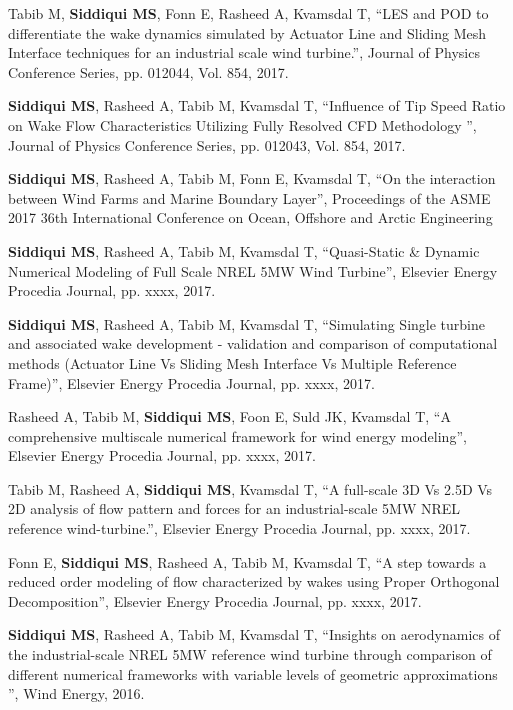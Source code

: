 \begin{cventries}
	\cventry
	{} %
	{} %
	{} %
	{} %
	{
		\begin{cvitems}
			\item {Tabib M, \textbf{Siddiqui MS}, Fonn E, Rasheed A, Kvamsdal T, “LES and POD to differentiate the wake dynamics simulated by Actuator Line and Sliding
				Mesh Interface techniques for an industrial scale
				wind turbine.”, Journal of Physics Conference Series, pp. 012044, Vol. 854, 2017.}
			\item {\textbf{Siddiqui MS}, Rasheed A, Tabib M, Kvamsdal T, “Influence of Tip Speed Ratio on Wake Flow Characteristics Utilizing Fully Resolved CFD Methodology ”, Journal of Physics Conference Series, pp. 012043, Vol. 854, 2017.}
			\item {\textbf{Siddiqui MS}, Rasheed A, Tabib M, Fonn E, Kvamsdal T, “On the interaction between Wind Farms and Marine Boundary Layer”, Proceedings of the ASME 2017 36th International Conference on Ocean, Offshore and Arctic Engineering}
			\item {\textbf{Siddiqui MS}, Rasheed A, Tabib M, Kvamsdal T, “Quasi-Static \& Dynamic Numerical Modeling of Full Scale NREL 5MW Wind Turbine”, Elsevier Energy Procedia Journal, pp. xxxx, 2017.}
			\item {\textbf{Siddiqui MS}, Rasheed A, Tabib M, Kvamsdal T, “Simulating Single turbine and associated wake development - validation and comparison of computational methods (Actuator Line Vs Sliding Mesh Interface Vs Multiple Reference Frame)”, Elsevier Energy Procedia Journal, pp. xxxx, 2017.}
			\item {Rasheed A, Tabib M, \textbf{Siddiqui MS}, Foon E, Suld JK, Kvamsdal T, “A comprehensive multiscale numerical framework for wind energy modeling”, Elsevier Energy Procedia Journal, pp. xxxx, 2017.}
			\item {Tabib M, Rasheed A, \textbf{Siddiqui MS}, Kvamsdal T, “A full-scale 3D Vs 2.5D Vs 2D analysis of flow
			pattern and forces for an industrial-scale 5MW
			NREL reference wind-turbine.”, Elsevier Energy Procedia Journal, pp. xxxx, 2017.}
			\item {Fonn E, \textbf{Siddiqui MS}, Rasheed A, Tabib M, Kvamsdal T, “A step towards a reduced order modeling of flow characterized by wakes using Proper Orthogonal Decomposition”, Elsevier Energy Procedia Journal, pp. xxxx, 2017.}
			\item{\textbf{Siddiqui MS}, Rasheed A, Tabib M, Kvamsdal T, “Insights on aerodynamics of the industrial-scale NREL 5MW reference wind turbine through comparison of different numerical frameworks with variable levels of geometric approximations ”, Wind Energy, 2016.}

\end{cvitems}}
\end{cventries}
